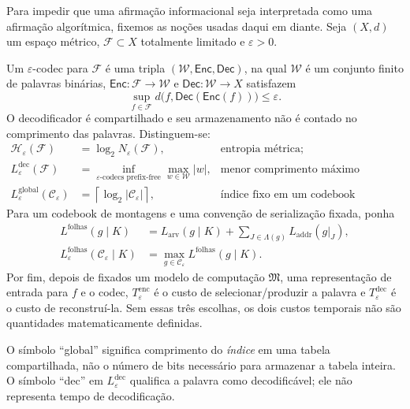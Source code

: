 Para impedir que uma afirmação informacional seja interpretada como uma
afirmação algorítmica, fixemos as noções usadas daqui em diante. Seja
$(X,d)$ um espaço métrico, $\mathcal F\subset X$ totalmente limitado e
$\varepsilon>0$.

\begin{definition}\label{def:coding-resources}
Um $\varepsilon$-codec para $\mathcal F$ é uma tripla
$(\mathcal W,\mathsf{Enc},\mathsf{Dec})$, na qual $\mathcal W$ é um conjunto
finito de palavras binárias, $\mathsf{Enc}:\mathcal F\to\mathcal W$ e
$\mathsf{Dec}:\mathcal W\to X$ satisfazem
\[
 \sup_{f\in\mathcal F}d\bigl(f,\mathsf{Dec}(\mathsf{Enc}(f))\bigr)
 \le\varepsilon.
\]
O decodificador é compartilhado e seu armazenamento não é contado no
comprimento das palavras. Distinguem-se:
\begin{align*}
 \mathcal H_\varepsilon(\mathcal F)
  &=\log_2N_\varepsilon(\mathcal F),
  &&\text{entropia métrica;}\\
 L_\varepsilon^{\mathrm{dec}}(\mathcal F)
  &=\inf_{\text{$\varepsilon$-codecs prefix-free}}
    \max_{w\in\mathcal W}|w|,
  &&\text{menor comprimento máximo decodificável;}\\
 L_\varepsilon^{\mathrm{global}}(\mathcal C_\varepsilon)
  &=\left\lceil\log_2|\mathcal C_\varepsilon|\right\rceil,
  &&\text{índice fixo em um codebook compartilhado.}
\end{align*}
Para um codebook de montagens e uma convenção de serialização fixada, ponha
\begin{align*}
 L^{\mathrm{folhas}}(g\mid K)
   &=L_{\mathrm{arv}}(g\mid K)
     +\sum_{J\in\Lambda(g)}L_{\mathrm{addr}}(g|_J),\\
 L_\varepsilon^{\mathrm{folhas}}(\mathcal C_\varepsilon\mid K)
   &=\max_{g\in\mathcal C_\varepsilon}L^{\mathrm{folhas}}(g\mid K).
\end{align*}
Por fim, depois de fixados um modelo de computação $\mathfrak M$, uma
representação de entrada para $f$ e o codec, $T_\varepsilon^{\mathrm{enc}}$
é o custo de selecionar/produzir a palavra e $T_\varepsilon^{\mathrm{dec}}$ é
o custo de reconstruí-la. Sem essas três escolhas, os dois custos temporais
não são quantidades matematicamente definidas.
\end{definition}

O símbolo ``global'' significa comprimento do \emph{índice} em uma tabela
compartilhada, não o número de bits necessário para armazenar a tabela inteira.
O símbolo ``dec'' em $L_\varepsilon^{\mathrm{dec}}$ qualifica a palavra como
decodificável; ele não representa tempo de decodificação.

